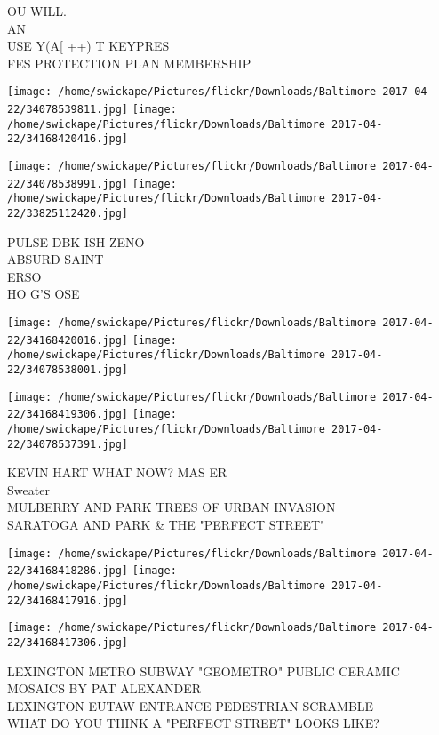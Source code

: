 \documentclass[10pt,letterpaper]{article}
\begin{document}
OU WILL.\\
AN\\
USE Y(A{[} ++) T KEYPRES\\
FES PROTECTION PLAN MEMBERSHIP
\pagebreak

\texttt{[image: /home/swickape/Pictures/flickr/Downloads/Baltimore 2017-04-22/34078539811.jpg]}
\texttt{[image: /home/swickape/Pictures/flickr/Downloads/Baltimore 2017-04-22/34168420416.jpg]}

\texttt{[image: /home/swickape/Pictures/flickr/Downloads/Baltimore 2017-04-22/34078538991.jpg]}
\texttt{[image: /home/swickape/Pictures/flickr/Downloads/Baltimore 2017-04-22/33825112420.jpg]}

PULSE DBK ISH ZENO\\
ABSURD SAINT\\
ERSO\\
HO G'S OSE
\pagebreak

\texttt{[image: /home/swickape/Pictures/flickr/Downloads/Baltimore 2017-04-22/34168420016.jpg]}
\texttt{[image: /home/swickape/Pictures/flickr/Downloads/Baltimore 2017-04-22/34078538001.jpg]}

\texttt{[image: /home/swickape/Pictures/flickr/Downloads/Baltimore 2017-04-22/34168419306.jpg]}
\texttt{[image: /home/swickape/Pictures/flickr/Downloads/Baltimore 2017-04-22/34078537391.jpg]}

KEVIN HART WHAT NOW?  MAS ER\\
Sweater\\
MULBERRY AND PARK TREES OF URBAN INVASION\\
SARATOGA AND PARK \& THE "PERFECT STREET"
\pagebreak

\texttt{[image: /home/swickape/Pictures/flickr/Downloads/Baltimore 2017-04-22/34168418286.jpg]}
\texttt{[image: /home/swickape/Pictures/flickr/Downloads/Baltimore 2017-04-22/34168417916.jpg]}

\vspace{0.25in}
\texttt{[image: /home/swickape/Pictures/flickr/Downloads/Baltimore 2017-04-22/34168417306.jpg]}

LEXINGTON METRO SUBWAY "GEOMETRO" PUBLIC CERAMIC MOSAICS BY PAT ALEXANDER\\
LEXINGTON EUTAW ENTRANCE PEDESTRIAN SCRAMBLE\\
WHAT DO YOU THINK A "PERFECT STREET" LOOKS LIKE?
\pagebreak
\end{document}
